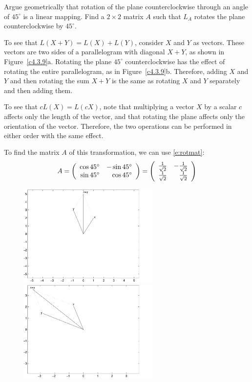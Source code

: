 \documentclass{ximera}
\begin{document}
\begin{exercise} \label{c4.3.9}
Argue geometrically that rotation of the plane counterclockwise
through an angle of $45^\circ$ is a linear mapping.  Find a
$2\times 2$ matrix $A$ such that $L_A$ rotates the plane
counterclockwise by $45^\circ$.

\begin{solution}

To see that $L(X + Y) = L(X) + L(Y)$, consider $X$ and $Y$ as
vectors.  These vectors are two sides of a parallelogram with
diagonal $X + Y$, as shown in Figure~\ref{c4.3.9}a.  Rotating
the plane $45^\circ$ counterclockwise has the effect of
rotating the entire parallelogram, as in Figure~\ref{c4.3.9}b.
Therefore, adding $X$ and $Y$ and then rotating the sum
$X + Y$ is the same as rotating $X$ and $Y$ separately and
then adding them.

\para To see that $cL(X) = L(cX)$, note that multiplying a
vector $X$ by a scalar $c$ affects only the length of the vector,
and that rotating the plane affects only the orientation of
the vector.  Therefore, the two operations can be performed in
either order with the same effect.

\para To find the matrix $A$ of this transformation, we can use
\eqref{e:rotmat}:
\[ A = \left(\begin{array}{rr} \cos 45^\circ & -\sin 45^\circ\\ \sin 45^\circ &\cos 45^\circ\end{array}\right)
= \left(\begin{array}{rr} \frac{1}{\sqrt{2}} & -\frac{1}{\sqrt{2}}\\ \frac{1}{\sqrt{2}} &\frac{1}{\sqrt{2}}\end{array}\right) \]

\begin{figure}[htb]
                       \centerline{%
                       \includegraphics[width=2.75in]{exfigure/4-3-9a.pdf}
                       \includegraphics[width=2.75in]{exfigure/4-3-9b.pdf}}
\end{figure}

\end{solution}
\end{exercise}
\end{document}
